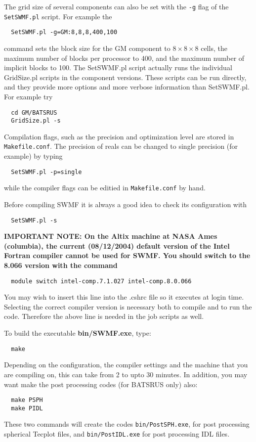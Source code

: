 The grid size of several components can also be set with the {\tt -g}
flag of the {\tt SetSWMF.pl} script. For example the 
\begin{verbatim}
  SetSWMF.pl -g=GM:8,8,8,400,100
\end{verbatim}
command sets the block size for the GM component to $8\times 8\times 8$ cells, 
the maximum number of blocks per processor to 400, 
and the maximum number of implicit blocks to 100.
The SetSWMF.pl script actually runs the individual GridSize.pl
scripts in the component versions. These scripts can be run directly,
and they provide more options and more verbose information than SetSWMF.pl.
For example try
\begin{verbatim}
  cd GM/BATSRUS
  GridSize.pl -s
\end{verbatim}
Compilation flags, such as the precision and optimization 
level are stored in {\tt Makefile.conf}. The precision of reals
can be changed to single precision (for example) by typing
\begin{verbatim}
  SetSWMF.pl -p=single
\end{verbatim}
while the compiler flags can be editied in {\tt Makefile.conf} by hand.

Before compiling SWMF it is always a good idea to check its configuration
with
\begin{verbatim}
  SetSWMF.pl -s
\end{verbatim}

{\bf IMPORTANT NOTE:
On the Altix machine at NASA Ames (columbia),
the current (08/12/2004) 
default version of the Intel Fortran compiler 
cannot be used for SWMF. 
You should switch to the 8.066 version with the command
\begin{verbatim}
  module switch intel-comp.7.1.027 intel-comp.8.0.066
\end{verbatim}
You may wish to insert this line into the .cshrc file
so it executes at login time. 
Selecting the correct compiler version is 
necessary both to compile and to run the code.
Therefore the above line is needed in the job scripts
as well.}

To build the executable {\bf bin/SWMF.exe}, type:
\begin{verbatim}
  make
\end{verbatim} 
Depending on the configuration, the compiler settings and the machine 
that you are compiling on, this can take from 2 to upto 30 minutes.  
In addition, you may want make the post processing
codes (for BATSRUS only) also:
\begin{verbatim}
  make PSPH
  make PIDL
\end{verbatim} 
These two commands will create the codes {\tt bin/PostSPH.exe}, for post
processing spherical Tecplot files, and {\tt bin/PostIDL.exe} 
for post processing IDL files.

